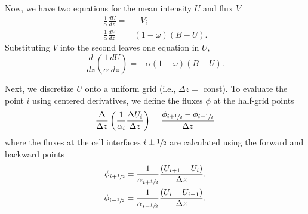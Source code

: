 Now, we have two equations for the mean intensity $U$ and flux $V$
\begin{align}
    \frac{1}{\alpha}\frac{dU}{dz} =& -V; \label{eqn:dUdz} \\
    \frac{1}{\alpha}\frac{dV}{dz} =& (1-\omega)(B-U). \label{eqn:dVdz}
\end{align}
Substituting $V$ into the second leaves one equation in $U$,
\begin{equation}\label{eqn:ddU/ddz}
    \frac{d}{dz} \left( \frac{1}{\alpha} \frac{dU}{dz} \right) = -\alpha(1-\omega)(B-U).
\end{equation}

Next, we discretize $U$ onto a uniform grid (i.e., $\Delta z =$ const).
To evaluate the point $i$ using centered derivatives, we define the fluxes $\phi$ at the half-grid points
\begin{equation}\label{eqn:U_i-discrete}
    \frac{\Delta}{\Delta z} \left( \frac{1}{\alpha_i}\frac{\Delta U_i}{\Delta z} \right) = \frac{\phi_{i+\sfrac{1}{2}} - \phi_{i-\sfrac{1}{2}}}{\Delta z}
\end{equation}
where the fluxes at the cell interfaces $i\pm\sfrac{1}{2}$ are calculated using the forward and backward points
\begin{eqnarray}
    \phi_{i+\sfrac{1}{2}} = \frac{1}{\alpha_{i+\sfrac{1}{2}}} \frac{(U_{i+1} - U_i)}{\Delta z}, \\
    \phi_{i-\sfrac{1}{2}} = \frac{1}{\alpha_{i-\sfrac{1}{2}}} \frac{(U_i - U_{i-1})}{\Delta z}.
\end{eqnarray}

